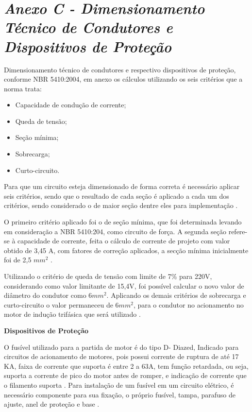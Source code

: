 	\newpage
	\section[Anexo C]{\emph{Anexo C - Dimensionamento Técnico de Condutores e Dispositivos de Proteção}}
	\label{sec:anexoC}

		Dimensionamento técnico de condutores e respectivo dispositivos de proteção, conforme NBR 5410:2004, em anexo os cálculos utilizando os seis critérios que a norma trata:

		\begin{itemize}
			\item Capacidade de condução de corrente;
			\item Queda de tensão;
			\item Seção mínima;
			\item Sobrecarga;
			\item Curto-circuito.
		\end{itemize}

		Para que um circuito esteja dimensionado de forma correta é necessário aplicar seis critérios, sendo que o resultado de cada seção é aplicado a cada um dos critérios, sendo considerado o de maior seção dentre eles para implementação \cite{NBR5410}.
		
		O primeiro critério aplicado foi o de seção mínima, que foi determinada levando em consideração a NBR 5410:204, como circuito de força. A segunda seção refere-se à capacidade de corrente, feita o cálculo de corrente de projeto com valor obtido de 3,45 A, com fatores de correção aplicados, a secção mínima inicialmente foi de 2,5 $mm^{2}$ \cite{NBR5410}.
		
		Utilizando o critério de queda de tensão com limite de 7\% para 220V, considerando como valor limitante de 15,4V, foi possível calcular o novo valor de diâmetro do condutor como 6$mm^{2}$. Aplicando os demais critérios de sobrecarga e curto-circuito o valor permaneceu de 6$mm^{2}$, para o condutor no acionamento no motor de indução trifásica que será utilizado \cite{NBR5410}.

		\textbf{Dispositivos de Proteção}

		O fusível utilizado para a partida de motor é do tipo D- Diazed, Indicado para circuitos de acionamento de motores, pois possui corrente de ruptura de até 17 KA, faixa de corrente que suporta é entre 2 a 63A, tem função retardada, ou seja, suporta a corrente de pico do motor antes de romper, e indicação de corrente que o filamento suporta \cite{WEG04}. Para instalação de um fusível em um circuito elétrico, é necessário componente para sua fixação, o próprio fusível, tampa, parafuso de ajuste, anel de proteção e base \cite{WEG04}.
		
